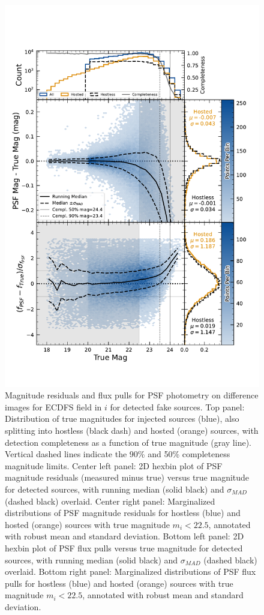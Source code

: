 \begin{figure}
    \centering
    \includegraphics[width=\linewidth]{figures/hexbin_psf_magpull.pdf}
    \caption{Magnitude residuals and flux pulls for \gls{PSF} photometry on difference images for ECDFS field in $i$ for detected fake sources.
     Top panel: Distribution of true magnitudes for injected sources (blue), also splitting into hostless (black dash) and hosted (orange) sources, with detection completeness as a function of true magnitude (gray line). Vertical dashed lines indicate the 90\% and 50\% completeness magnitude limits.
    Center left panel: 2D hexbin plot of PSF magnitude residuals (measured minus true) versus true magnitude for detected sources, with running median (solid black) and $\sigma_{MAD}$ (dashed black) overlaid.
    Center right panel: Marginalized distributions of PSF magnitude residuals for hostless (blue) and hosted (orange) sources with true magnitude $m_i < 22.5$, annotated with robust mean and standard deviation.
    Bottom left panel: 2D hexbin plot of PSF flux pulls versus true magnitude for detected sources, with running median (solid black) and $\sigma_{MAD}$ (dashed black) overlaid.
    Bottom right panel: Marginalized distributions of PSF flux pulls for hostless (blue) and hosted (orange) sources with true magnitude $m_i < 22.5$, annotated with robust mean and standard deviation.
    }
    \label{fig:phot_residual_diffim_fakes}
\end{figure}

